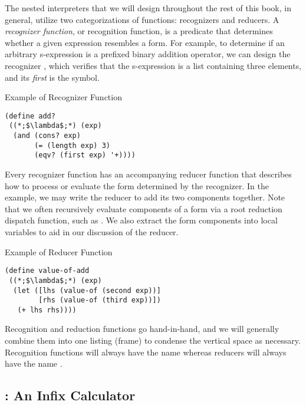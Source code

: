 The nested interpreters that we will design throughout the rest of this book, in general, utilize two categorizations of functions: recognizers and reducers. A \textit{recognizer function}, or recognition function, is a predicate that determines whether a given expression resembles a form. For example, to determine if an arbitrary s-expression is a prefixed binary addition operator, we can design the recognizer , which verifies that the s-expression is a list containing three elements, and its \textit{first} is the \ttt{\q{+}} symbol.

\begin{cl}[]{Example of  Recognizer Function}
\begin{lstlisting}[language=MyScheme]
(define add?
 ((*;$\lambda$;*) (exp)
  (and (cons? exp)
       (= (length exp) 3)
       (eqv? (first exp) '+))))
\end{lstlisting}
\end{cl}

Every recognizer function has an accompanying reducer function that describes how to process or evaluate the form determined by the recognizer. In the  example, we may write the  reducer to add its two components together. Note that we often recursively evaluate components of a form via a root reduction dispatch function, such as . We also extract the form components into local variables to aid in our discussion of the reducer.

\begin{cl}[]{Example of  Reducer Function}
\begin{lstlisting}[language=MyScheme]
(define value-of-add
 ((*;$\lambda$;*) (exp)
  (let ([lhs (value-of (second exp))]
        [rhs (value-of (third exp))])
   (+ lhs rhs))))
\end{lstlisting}
\end{cl}

Recognition and reduction functions go hand-in-hand, and we will generally combine them into one listing (frame) to condense the vertical space as necessary. Recognition functions will always have the name  whereas reducers will always have the name .

\clearpage
\subsection*{: An Infix Calculator}

